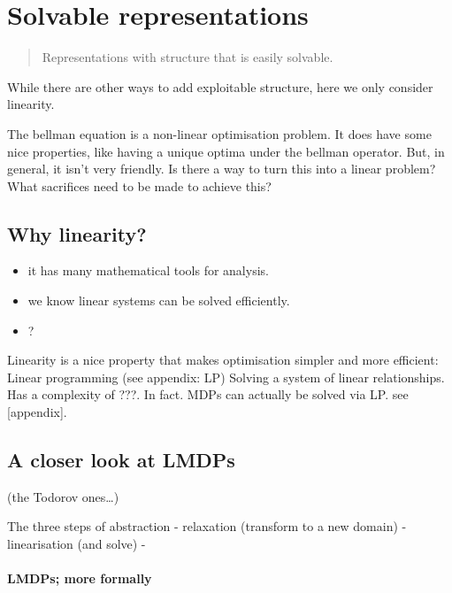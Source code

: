 \hypertarget{solveble-representations}{%
\section{Solvable representations}\label{solvable-representations}}

\begin{quote}
Representations with structure that is easily solvable.
\end{quote}

While there are other ways to add exploitable structure, here we only
consider linearity.

The bellman equation is a non-linear optimisation problem. It does have
some nice properties, like having a unique optima under the bellman
operator. But, in general, it isn't very friendly. Is there a way to
turn this into a linear problem? What sacrifices need to be made to
achieve this?

\hypertarget{why-linearity}{%
\subsection{Why linearity?}\label{why-linearity}}

\begin{itemize}
\tightlist
\item
  it has many mathematical tools for analysis.
\item
  we know linear systems can be solved efficiently.
\item
  ?
\end{itemize}

Linearity is a nice property that makes optimisation simpler and more
efficient: Linear programming (see appendix: LP)
Solving a system of linear relationships. Has a complexity of ???.
In fact. MDPs can actually be solved via LP. see {[}appendix{]}.

\hypertarget{a-closer-look-at-lmdps}{%
\subsection{A closer look at LMDPs}\label{a-closer-look-at-lmdps}}

(the Todorov ones\ldots{})

The three steps of abstraction - relaxation (transform to a new domain)
- linearisation (and solve) -

\hypertarget{lmdps-more-formally}{%
\paragraph{LMDPs; more formally}\label{lmdps-more-formally}}

